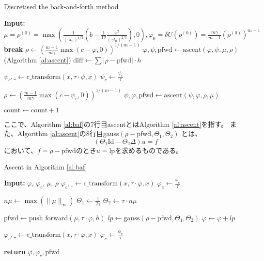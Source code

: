 \begin{algorithm}
    \caption{Discretised the back-and-forth method}
    \label{al:baf}
    \begin{algorithmic}[1]
        \State \textbf{Input:} $\mu = \rho^{(0)} = \max\left(\frac{1}{(\gamma t_0)^{1/3}}\left(b - \frac{1}{12}\frac{x^2}{(\gamma t_0)^{2/3}}\right),0\right), \varphi_0 = \delta U(\rho^{(0)}) = \frac{m \gamma}{m-1} \left(\rho^{(0)}\right)^{m-1}$
                \State \textbf{break}
            \EndIf
            \State $\rho \leftarrow \left(\frac{m-1}{m\gamma}\max(c - \varphi, 0)\right)^{1/(m-1)}$
            \State $\varphi, \psi, \text{pfwd} \leftarrow \text{ascent}(\varphi, \psi, \mu, \rho)$ (Algorithm \ref{al:ascent})
            \State $\text{diff} \leftarrow \sum \left|\rho - \text{pfwd}\right| \cdot h$
    
            \State $\psi_c, \_ \leftarrow \text{c\_transform}(x, \tau \cdot \psi, x)$ 
            \State $\psi_c \leftarrow \frac{\psi_c}{\tau}$
    
            \State $\rho \leftarrow \left(\frac{m-1}{m\gamma}\max(c - \psi_c, 0)\right)^{1/(m-1)}$
            \State $\psi, \varphi, \text{pfwd} \leftarrow \text{ascent}(\psi, \varphi, \rho, \mu)$
    
            \State $\text{count} \leftarrow \text{count} + 1$
        \EndWhile
    \end{algorithmic}
\end{algorithm}
ここで、Algorithm \ref{al:baf}の7行目ascentとはAlgorithm \ref{al:ascent}を指す。
また、Algorithm \ref{al:ascent}の8行目gauss$(\rho - \text{pfwd}, \Theta_1, \Theta_2)$ とは、
\[
    (\Theta_1 \text{Id} - \Theta_2 \Delta)u = f
\]
において、$f = \rho - \text{pfwd}$のとき$u = \text{lp}$を求めるものである。
    \begin{algorithm}
        \caption{Ascent in Algorithm \ref{al:baf}}
        \label{al:ascent}
        \begin{algorithmic}[1]
            \State \textbf{Input:} $\varphi$, $\varphi_c$, $\mu$, $\rho$
            \State $\varphi_c, \_ \leftarrow \text{c\_transform}(x, \tau \cdot \varphi, x)$ 
            \State $\varphi_c \leftarrow \frac{\varphi_c}{\tau}$
        
            \State $n\mu \leftarrow \max(\lVert\mu\rVert_\infty)$
            \State $\Theta_1 \leftarrow \frac{1}{2\gamma}$
            \State $\Theta_2 \leftarrow \tau \cdot n\mu$
        
            \State $\text{pfwd} \leftarrow \text{push\_forward}(\mu, \tau \cdot \varphi, h)$ 
            \State $lp \leftarrow \text{gauss}(\rho - \text{pfwd}, \Theta_1, \Theta_2)$ 
            \State $\varphi \leftarrow \varphi + lp$ 
            
            \State $\varphi_c, \_ \leftarrow \text{c\_transform}(x, \tau \cdot \varphi, x)$
            \State $\varphi_c \leftarrow \frac{\phi_c}{\tau}$
    
            \State \textbf{return}  $\varphi, \varphi_c, \text{pfwd}$ 
        \end{algorithmic}
    \end{algorithm}